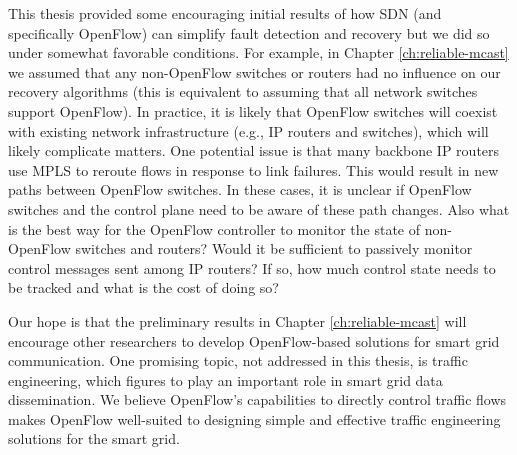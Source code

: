 This thesis provided some encouraging initial results of how SDN (and specifically OpenFlow) can simplify fault detection and recovery but we did so under somewhat favorable conditions.  For example,
in Chapter \ref{ch:reliable-mcast} we assumed that any non-OpenFlow switches or routers had no influence on our recovery algorithms (this is equivalent to assuming 
that all network switches support OpenFlow). 
In practice, it is likely that OpenFlow switches will coexist with existing network infrastructure (e.g., IP routers and switches), which will likely complicate matters.  One potential
issue is that many backbone IP routers use MPLS to reroute flows in response to link failures.  This would result in new paths between OpenFlow switches. 
In these cases, it is unclear if OpenFlow switches and the control plane need to be aware of these path changes. %
Also what is the best way for the OpenFlow controller to monitor the state of non-OpenFlow switches and routers? 
Would it be sufficient to passively monitor control messages sent among IP routers?  If so, how much control state needs to be tracked and what is the cost of doing so? 

Our hope is that the preliminary results in Chapter \ref{ch:reliable-mcast} will encourage other researchers to develop OpenFlow-based solutions for smart grid communication.  One promising
topic, not addressed in this thesis, is traffic engineering, which figures to play an important role in smart grid data dissemination. 
We believe OpenFlow's capabilities to directly control traffic flows makes OpenFlow well-suited to designing simple and effective traffic engineering solutions for the smart grid.

